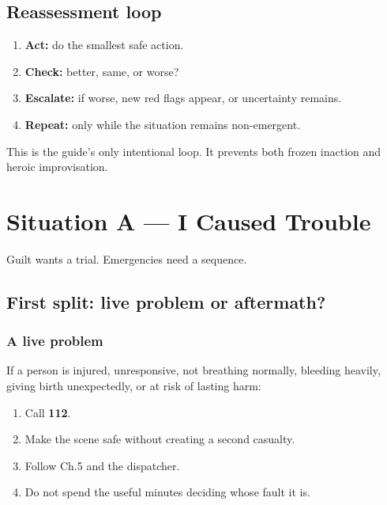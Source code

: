 \hypertarget{reassessment-loop}{%
\subsection{Reassessment loop}\label{reassessment-loop}}

\begin{enumerate}
\def\labelenumi{\arabic{enumi}.}
\tightlist
\item
  \textbf{Act:} do the smallest safe action.
\item
  \textbf{Check:} better, same, or worse?
\item
  \textbf{Escalate:} if worse, new red flags appear, or uncertainty
  remains.
\item
  \textbf{Repeat:} only while the situation remains non-emergent.
\end{enumerate}

This is the guide's only intentional loop. It prevents both frozen
inaction and heroic improvisation.

\hypertarget{02-situation-a}{}
\hypertarget{situation-a-i-caused-trouble}{%
\section{Situation A --- I Caused
Trouble}\label{situation-a-i-caused-trouble}}

Guilt wants a trial. Emergencies need a sequence.

\hypertarget{first-split-live-problem-or-aftermath}{%
\subsection{First split: live problem or
aftermath?}\label{first-split-live-problem-or-aftermath}}

\hypertarget{a-live-problem}{%
\subsubsection{A live problem}\label{a-live-problem}}

If a person is injured, unresponsive, not breathing normally, bleeding
heavily, giving birth unexpectedly, or at risk of lasting harm:

\begin{enumerate}
\def\labelenumi{\arabic{enumi}.}
\tightlist
\item
  Call \textbf{112}.
\item
  Make the scene safe without creating a second casualty.
\item
  Follow Ch.5 and the dispatcher.
\item
  Do not spend the useful minutes deciding whose fault it is.
\end{enumerate}

